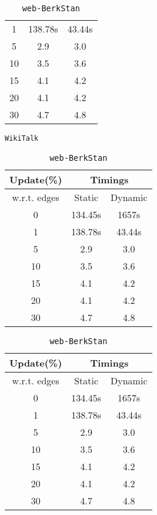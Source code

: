 \begin{table}[H]
{\begin{tabular}{|c|c|c|}
        1 & 138.78s & 43.44s \\
        5 & 2.9 & 3.0 \\
        10 & 3.5 & 3.6 \\
        15 & 4.1 & 4.2 \\
        20 & 4.1 & 4.2 \\
        30 & 4.7 & 4.8 \\
        \hline
    \end{tabular}
}
\hfill
\parbox{0.45\linewidth}{
    \vspace{1.5em}
    \centering
    \caption{\texttt{WikiTalk}}
    \label{tab:WikiTalk}
    \begin{tabular}{|c|c|c|}
        \hline
        \textbf{Update(\%)} & \multicolumn{2}{c|}{\textbf{Timings}} \\
        \hline
        w.r.t. edges & Static &  Dynamic \\
        \hline
        0 & 134.45s & 1657s \\
        1 & 138.78s & 43.44s \\
        5 & 2.9 & 3.0 \\
        10 & 3.5 & 3.6 \\
        15 & 4.1 & 4.2 \\
        20 & 4.1 & 4.2 \\
        30 & 4.7 & 4.8 \\
        \hline
    \end{tabular}
}
\hfill
\parbox{0.45\linewidth}{
    \vspace{1.5em}
    \centering
    \caption{\texttt{web-BerkStan}}
    \label{tab:web-BerkStan}
    \begin{tabular}{|c|c|c|}
        \hline
        \textbf{Update(\%)} & \multicolumn{2}{c|}{\textbf{Timings}} \\
        \hline
        w.r.t. edges & Static &  Dynamic \\
        \hline
        0 & 134.45s & 1657s \\
        1 & 138.78s & 43.44s \\
        5 & 2.9 & 3.0 \\
        10 & 3.5 & 3.6 \\
        15 & 4.1 & 4.2 \\
        20 & 4.1 & 4.2 \\
        30 & 4.7 & 4.8 \\
        \hline
    \end{tabular}
}
\hfill
\parbox{0.45\linewidth}{
    \vspace{1.5em}
}
\end{table}
